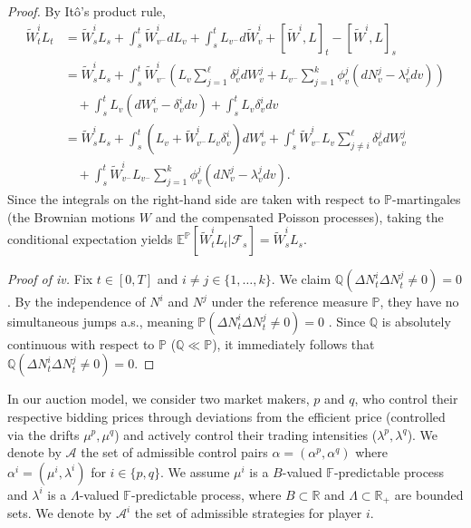 \documentclass[12pt]{article}
\begin{document}
\begin{proof}
By Itô's product rule, 
\begin{align*}
    \tilde{W}^i_t L_t &= \tilde{W}^i_s L_s + \int_s^t \tilde{W}^i_{v^-} dL_v + \int_s^t L_{v^-} d\tilde{W}^i_v + [\tilde{W}^i, L]_t - [\tilde{W}^i, L]_s \\
    &= \tilde{W}^i_s L_s + \int_s^t \tilde{W}^i_{v^-} \left(L_v \sum_{j=1}^\ell \delta_v^j dW_v^j + L_{v^-} \sum_{j=1}^k \phi_v^j (dN_v^j - \lambda_v^j dv)\right) \\
    &\quad + \int_s^t L_v (dW_v^i - \delta_v^i dv) + \int_s^t L_v \delta_v^i dv \\
    &= \tilde{W}^i_s L_s + \int_s^t \left(L_v + \tilde{W}^i_{v^-} L_v \delta_v^i \right) dW_v^i + \int_s^t \tilde{W}^i_{v^-} L_v \sum_{j \neq i}^\ell \delta_v^j dW_v^j \\
    &\quad + \int_s^t \tilde{W}^i_{v^-} L_{v^-} \sum_{j=1}^k \phi_v^j (dN_v^j - \lambda_v^j dv).
\end{align*}
Since the integrals on the right-hand side are taken with respect to $\mathbb{P}$-martingales (the Brownian motions $W$ and the compensated Poisson processes), taking the conditional expectation yields $\mathbb{E}^\mathbb{P}[\tilde{W}^i_t L_t|\mathcal{F}_s] = \tilde{W}^i_s L_s$.

\textit{Proof of iv.} Fix $t \in [0,T]$ and $i \ne j \in \{1, \dots, k\}$. We claim $\mathbb{Q}(\Delta N_t^i \Delta N_t^j \neq 0) = 0$. By the independence of $N^i$ and $N^j$ under the reference measure $\mathbb{P}$, they have no simultaneous jumps a.s., meaning $\mathbb{P}(\Delta N_t^i \Delta N_t^j \neq 0) = 0$ \cite[Proposition 3.1]{bjork2021point}. Since $\mathbb{Q}$ is absolutely continuous with respect to $\mathbb{P}$ ($\mathbb{Q} \ll \mathbb{P}$), it immediately follows that $\mathbb{Q}(\Delta N_t^i \Delta N_t^j \neq 0) = 0$.
\end{proof}

In our auction model, we consider two market makers, $p$ and $q$, who control their respective bidding prices through deviations from the efficient price (controlled via the drifts $\mu^p, \mu^q$) and actively control their trading intensities ($\lambda^p, \lambda^q$). We denote by $\mathcal{A}$ the set of admissible control pairs $\alpha=(\alpha^p,\alpha^q)$ where $\alpha^i=(\mu^i,\lambda^i)$ for $i \in \{p,q\}$. We assume $\mu^i$ is a $B$-valued $\mathbb{F}$-predictable process and $\lambda^i$ is a $\Lambda$-valued $\mathbb{F}$-predictable process, where $B \subset \mathbb{R}$ and $\Lambda \subset \mathbb{R}_+$ are bounded sets. We denote by $\mathcal{A}^i$ the set of admissible strategies for player $i$. 
\end{document}

